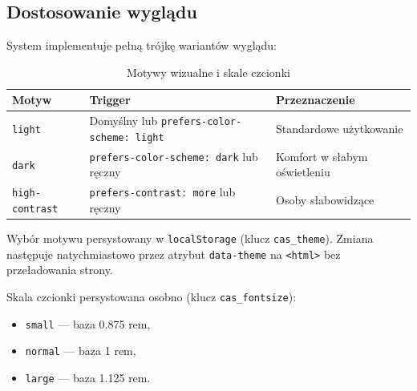 \documentclass[12pt, a4paper]{article}
\begin{document}
\subsection{Dostosowanie wyglądu}

System implementuje pełną trójkę wariantów wyglądu:

\begin{table}[H]
  \centering
  \caption{Motywy wizualne i skale czcionki}
  \begin{tabular}{@{}L{3.5cm}L{5cm}L{5.5cm}@{}}
    \toprule
    \textbf{Motyw} & \textbf{Trigger} & \textbf{Przeznaczenie} \\
    \midrule
    \texttt{light}         & Domyślny lub \texttt{prefers-color-scheme: light} & Standardowe użytkowanie \\
    \addlinespace
    \texttt{dark}          & \texttt{prefers-color-scheme: dark} lub ręczny    & Komfort w słabym oświetleniu \\
    \addlinespace
    \texttt{high-contrast} & \texttt{prefers-contrast: more} lub ręczny        & Osoby słabowidzące \\
    \bottomrule
  \end{tabular}
\end{table}

Wybór motywu persystowany w \texttt{localStorage} (klucz \texttt{cas\_theme}). Zmiana
następuje natychmiastowo przez atrybut \texttt{data-theme} na \texttt{<html>} bez
przeładowania strony.

Skala czcionki persystowana osobno (klucz \texttt{cas\_fontsize}):
\begin{itemize}
  \item \texttt{small} --- baza 0.875 rem,
  \item \texttt{normal} --- baza 1 rem,
  \item \texttt{large} --- baza 1.125 rem.
\end{itemize}

\end{document}
